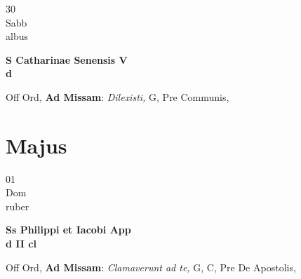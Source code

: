 \documentclass[10pt, openany]{book}
\begin{document}
        \begin{center}
            \begin{minipage}{3.5in}
                \vspace{2em}
                \begin{minipage}{0.5in}
                    {\Huge 30} \\
                    {\normalsize Sabb} \\
                    {\normalsize albus}
                \end{minipage}
                \begin{minipage}{3.0in}
                    \textbf{ \large S Catharinae Senensis V \\
                    \textnormal{\normalsize d}} \\ 
                \end{minipage}
                \begin{justify}Off Ord, \textbf{Ad Missam}: \textit{Dilexisti,} G, Pre Communis,  
                \end{justify}
            \end{minipage}
        \end{center}
    
        \chapter{Majus}
                        
        \begin{center}
            \begin{minipage}{3.5in}
                \vspace{2em}
                \begin{minipage}{0.5in}
                    {\Huge 01} \\
                    {\normalsize Dom} \\
                    {\normalsize ruber}
                \end{minipage}
                \begin{minipage}{3.0in}
                    \textbf{ \large Ss Philippi et Iacobi App \\
                    \textnormal{\normalsize d II cl}} \\ 
                \end{minipage}
                \begin{justify}Off Ord, \textbf{Ad Missam}: \textit{Clamaverunt ad te,} G, C, Pre De Apostolis,  
                \end{justify}
            \end{minipage}
        \end{center}
    
\end{document}
